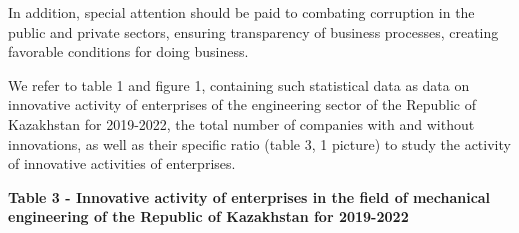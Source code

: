 {{In addition, special attention should be paid to combating corruption in
the public and private sectors, ensuring transparency of business
processes, creating favorable conditions for doing business.

We refer to table 1 and figure 1, containing such statistical data as
data on innovative activity of enterprises of the engineering sector of
the Republic of Kazakhstan for 2019-2022, the total number of companies
with and without innovations, as well as their specific ratio (table 3,
1 picture) to study the activity of innovative activities of
enterprises.

{\bfseries Table 3 - Innovative activity of enterprises in the field of
mechanical engineering of the Republic of Kazakhstan for 2019-2022}


}}
